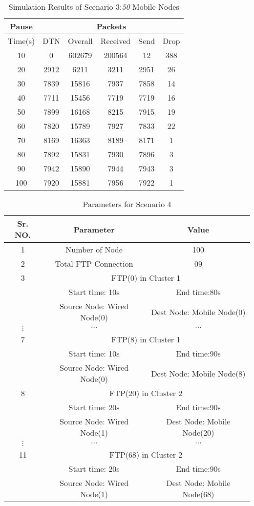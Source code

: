 \documentclass[3p,times]{elsarticle}
\begin{document}
\begin{table}[t]
\centering
\caption{Simulation Results of Scenario 3:\emph{50} Mobile Nodes}
\label{t8}
\begin{tabular}{|c|c|c|c|c|c|}
\hline
Pause  & \multicolumn{5}{c|}{Packets} \\
\hline
Time(s) & DTN   & Overall & Received & Send & Drop \\
\hline
10 & 0 & 602679 & 200564 & 12 &  388 \\
20 & 2912 & 6211 & 3211 & 2951 & 26\\
30 & 7839 & 15816 & 7937 & 7858 & 14 \\
40 & 7711 & 15456 & 7719 & 7719 & 16 \\
50 & 7899 & 16168 & 8215 & 7915 &  19 \\
60 & 7820 & 15789 & 7927 & 7833 &  22 \\
70 & 8169 & 16363 & 8189 & 8171 &  1 \\
80 & 7892 & 15831 & 7930 & 7896 &  3 \\
90 & 7942 & 15890 & 7944 & 7943 &  3 \\
100 & 7920 & 15881 & 7956 & 7922 &  1 \\
\hline
\end{tabular}
\end{table}


\begin{table}[t]
\centering
\caption{Parameters for Scenario 4}
\label{t9}
\begin{tabular}{|c|c|c|}
\hline
Sr. NO. & Parameter & Value \\
\hline
1 & Number of Node & 100 \\
2 & Total FTP Connection & 09 \\
\hline
3 & \multicolumn{2}{|c|}{ FTP(0) in Cluster 1} \\
 & Start time: 10s &  End time:80s\\
 & Source Node: Wired Node(0) & Dest Node: Mobile Node(0) \\
$ \vdots $ & $ \cdots $ & $ \cdots $ \\
\hline
7 & \multicolumn{2}{|c|}{ FTP(8) in Cluster 1} \\
 & Start time: 10s &  End time:90s\\
 & Source Node: Wired Node(0) & Dest Node: Mobile Node(8) \\
\hline
8 & \multicolumn{2}{|c|}{ FTP(20) in Cluster 2} \\
 & Start time: 20s &  End time:90s\\
 & Source Node: Wired Node(1) & Dest Node: Mobile Node(20) \\
\hline
$ \vdots $ & $ \cdots $ & $ \cdots $ \\
\hline
11 & \multicolumn{2}{|c|}{ FTP(68) in Cluster 2} \\
 & Start time: 20s &  End time:90s\\
 & Source Node: Wired Node(1) & Dest Node: Mobile Node(68) \\
\hline
\end{tabular}
\end{table}
\end{document}
